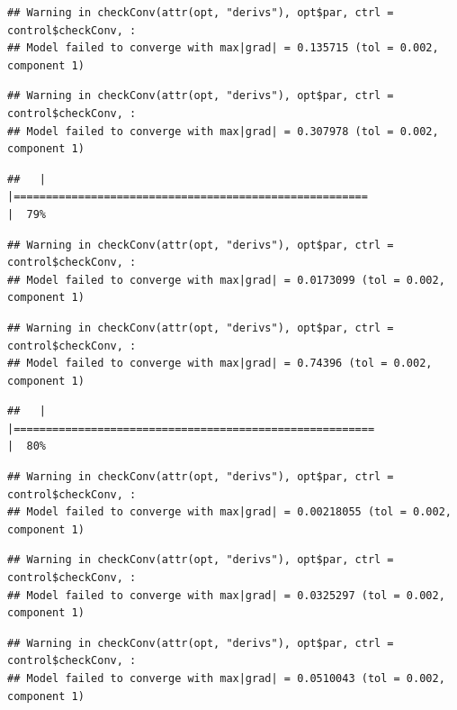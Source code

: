 \documentclass[
  12pt,
]{book}
\begin{document}
\begin{verbatim}
## Warning in checkConv(attr(opt, "derivs"), opt$par, ctrl = control$checkConv, :
## Model failed to converge with max|grad| = 0.135715 (tol = 0.002, component 1)
\end{verbatim}

\begin{verbatim}
## Warning in checkConv(attr(opt, "derivs"), opt$par, ctrl = control$checkConv, :
## Model failed to converge with max|grad| = 0.307978 (tol = 0.002, component 1)
\end{verbatim}

\begin{verbatim}
##   |                                                                              |=======================================================               |  79%
\end{verbatim}

\begin{verbatim}
## Warning in checkConv(attr(opt, "derivs"), opt$par, ctrl = control$checkConv, :
## Model failed to converge with max|grad| = 0.0173099 (tol = 0.002, component 1)
\end{verbatim}

\begin{verbatim}
## Warning in checkConv(attr(opt, "derivs"), opt$par, ctrl = control$checkConv, :
## Model failed to converge with max|grad| = 0.74396 (tol = 0.002, component 1)
\end{verbatim}

\begin{verbatim}
##   |                                                                              |========================================================              |  80%
\end{verbatim}

\begin{verbatim}
## Warning in checkConv(attr(opt, "derivs"), opt$par, ctrl = control$checkConv, :
## Model failed to converge with max|grad| = 0.00218055 (tol = 0.002, component 1)
\end{verbatim}

\begin{verbatim}
## Warning in checkConv(attr(opt, "derivs"), opt$par, ctrl = control$checkConv, :
## Model failed to converge with max|grad| = 0.0325297 (tol = 0.002, component 1)
\end{verbatim}

\begin{verbatim}
## Warning in checkConv(attr(opt, "derivs"), opt$par, ctrl = control$checkConv, :
## Model failed to converge with max|grad| = 0.0510043 (tol = 0.002, component 1)
\end{verbatim}
\end{document}
